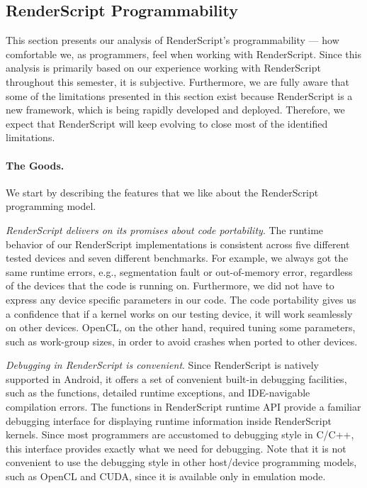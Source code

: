 \subsection{RenderScript Programmability}
This section presents our analysis of RenderScript's programmability --- how
comfortable we, as programmers, feel when working with RenderScript. Since this
analysis is primarily based on our experience working with RenderScript
throughout this semester, it is subjective. Furthermore, we are fully aware
that some of the limitations presented in this section exist because
RenderScript is a new framework, which is being rapidly developed and deployed.
Therefore, we expect that RenderScript will keep evolving to close most of the
identified limitations.

\paragraph{The Goods.}
We start by describing the features that we like about the RenderScript
programming model.

\textit{RenderScript delivers on its promises about code portability}.
The runtime behavior of our RenderScript implementations is consistent across
five different tested devices and seven different benchmarks. For example, we
always got the same runtime errors, e.g., segmentation fault or out-of-memory
error, regardless of the devices that the code is running on. Furthermore, we
did not have to express any device specific parameters in our code. The code
portability gives us a confidence that if a kernel works on our testing device,
it will work seamlessly on other devices. OpenCL, on the other hand, required
tuning some
parameters, such as work-group sizes, in order to avoid crashes when ported to
other devices.

\textit{Debugging in RenderScript is convenient}. Since RenderScript is natively
supported in Android, it offers a set of convenient built-in debugging
facilities, such as the  functions, detailed runtime exceptions,
and IDE-navigable compilation errors. The  functions in
RenderScript runtime API provide a familiar debugging interface for displaying
runtime information inside RenderScript kernels. Since most programmers are accustomed
to  debugging style in C/C++, this interface provides exactly
what we need for debugging. Note that it is not convenient to use the
 debugging style in other host/device programming models, such as
OpenCL and CUDA, since it is available only in emulation mode.


